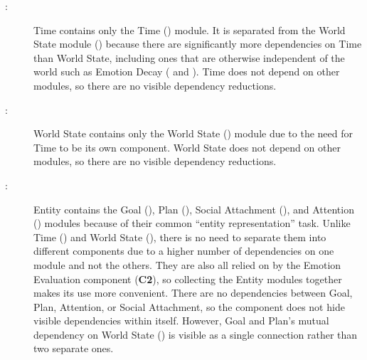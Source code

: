 \begin{description}
    \item [ \mthecpnum \label{cpTime}:] Time contains
    only the Time (\textbf{}) module. It is separated from the
    World State module (\textbf{}) because there are significantly
    more dependencies on Time than World State, including ones that are
    otherwise independent of the world such as Emotion Decay
    (\textbf{} and \textbf{}). Time does not
    depend on other modules, so there are no visible dependency reductions.

    \item [ \mthecpnum \label{cpWorld}:] World State
    contains only the World State (\textbf{}) module due to the
    need for Time to be its own component. World State does not depend on other
    modules, so there are no visible dependency reductions.

    \item [ \mthecpnum \label{cpEntity}:] Entity contains
    the Goal (\textbf{}), Plan (\textbf{}), Social
    Attachment (\textbf{}), and Attention
    (\textbf{}) modules because of their common ``entity
    representation'' task. Unlike Time (\textbf{}) and World State
    (\textbf{}), there is no need to separate them into different
    components due to a higher number of dependencies on one module and not the
    others. They are also all relied on by the Emotion Evaluation component
    (\textbf{C2}), so collecting the Entity modules together makes its use more
    convenient. There are no dependencies between Goal, Plan, Attention, or
    Social Attachment, so the component does not hide visible dependencies
    within itself. However, Goal and Plan's mutual dependency on World State
    (\textbf{}) is visible as a single connection rather than two
    separate ones.

\end{description}

